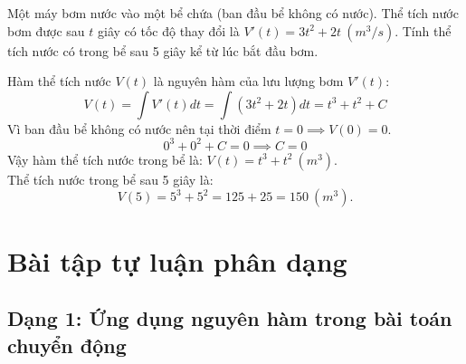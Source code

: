 \documentclass[12pt]{article}
\begin{document}
	\begin{vidu}[5]
		Một máy bơm nước vào một bể chứa (ban đầu bể không có nước). Thể tích nước bơm được sau $t$ giây có tốc độ thay đổi là $V'(t) = 3t^2 + 2t \ (m^3/s)$. Tính thể tích nước có trong bể sau 5 giây kể từ lúc bắt đầu bơm.
	\end{vidu}
	
	\begin{loigiai}
		Hàm thể tích nước $V(t)$ là nguyên hàm của lưu lượng bơm $V'(t)$:
		$$V(t) = \int V'(t)dt = \int (3t^2 + 2t)dt = t^3 + t^2 + C$$
		Vì ban đầu bể không có nước nên tại thời điểm $t = 0 \implies V(0) = 0$.
		$$0^3 + 0^2 + C = 0 \implies C = 0$$
		Vậy hàm thể tích nước trong bể là: $V(t) = t^3 + t^2 \ (m^3)$.\\
		Thể tích nước trong bể sau 5 giây là:
		$$V(5) = 5^3 + 5^2 = 125 + 25 = 150 \ (m^3).$$
	\end{loigiai}
	
	\vspace{5cm} %
	
	
	\newpage
	
	\section{Bài tập tự luận phân dạng}
	
	\subsection{Dạng 1: Ứng dụng nguyên hàm trong bài toán chuyển động}
	
\end{document}
